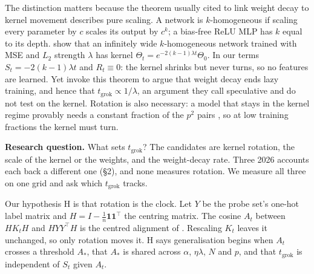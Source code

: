 \documentclass[a4paper,11pt]{article} %
\newcommand{\tgrok}{t_{\mathrm{grok}}}
\begin{document}
The distinction matters because the theorem usually cited to link weight
decay to kernel movement describes pure scaling. A network is $k$-homogeneous
if scaling every parameter by $c$ scales its output by $c^k$; a bias-free ReLU
MLP has $k$ equal to its depth. \citet[Thms.~1--2]{lewkowycz2020l2} show that
an infinitely wide $k$-homogeneous network trained with MSE and $L_2$
strength $\lambda$ has kernel $\Theta_t=e^{-2(k-1)\lambda t}\Theta_0$.
In our terms $S_t=-2(k-1)\lambda t$ and $R_t\equiv0$: the kernel shrinks but
never turns, so no features are learned. Yet
\citet[App.~13, arXiv v3]{kumar2024grokking} invoke this theorem to argue that
weight decay ends lazy training, and hence that $\tgrok\propto1/\lambda$, an argument
they call speculative and do not test on the kernel. Rotation is also
necessary: a model that stays in the kernel regime provably needs a constant
fraction of the $p^2$ pairs \citep{mohamadi2024grok}, so at low training
fractions the kernel must turn.

\textbf{Research question.} What sets $\tgrok$? The candidates are kernel
rotation, the scale of the kernel or the weights, and the weight-decay rate.
Three 2026 accounts each back a different one (\S2), and none measures
rotation. We measure all three on one grid and ask which $\tgrok$ tracks.

Our hypothesis H is that rotation is the clock. Let $Y$ be the probe set's
one-hot label matrix and $H=I-\tfrac1n\mathbf{1}\mathbf{1}^\top$ the centring
matrix. The cosine $A_t$ between $HK_tH$ and $HYY^\top H$ is the
centred alignment of \citet{cortes2012alignment}. Rescaling $K_t$ leaves it
unchanged, so only rotation moves it. H says generalisation begins when $A_t$ crosses a
threshold $A_*$, that $A_*$ is shared across $\alpha$, $\eta\lambda$, $N$ and
$p$, and that $\tgrok$ is independent of $S_t$ given $A_t$.


\end{document}
